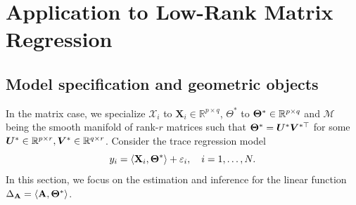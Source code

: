 \documentclass[authoryear,preprint,review,12pt]{elsarticle}
\begin{document}
	
	
	
	\section{Application to Low-Rank Matrix Regression}\label{sec:matrix}
	
	\subsection{Model specification and geometric objects}
	In the matrix case, we specialize $\mathcal{X}_i$ to $\mathbf{X}_i \in \mathbb{R}^{p\times q}$, $\Theta^\ast$ to $\mathbf{\Theta}^\ast \in \mathbb{R}^{p\times q}$  and $\mathcal{M}$ being the smooth manifold of rank-$r$ matrices such that  $\mathbf{\Theta}^\ast = \boldsymbol U^\ast \boldsymbol V^{\ast\top}$ for some $\boldsymbol U^\ast\in\mathbb{R}^{p\times r}, \boldsymbol V^\ast\in\mathbb{R}^{q\times r}$. Consider the trace regression model
	\begin{equation}
		y_i = \langle \mathbf{X}_i, \mathbf{\Theta}^\ast \rangle + \varepsilon_i, 
		\quad i = 1,\dots,N.
	\end{equation}
	In this section, we focus on the estimation and inference for the linear function  $\Delta_{\mathbf{A}}=\langle \mathbf{A},\mathbf{\Theta}^\ast\rangle$.
	
\end{document}

